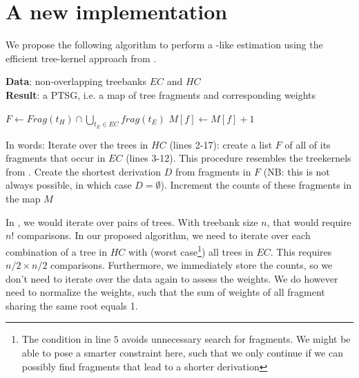 \section{A new implementation}


We propose the following algorithm to perform a \dops{}-like estimation using the efficient tree-kernel approach from \ddop{}.

\begin{algorithm}[H]
{\bf Data}: non-overlapping treebanks $EC$ and $HC$\\
{\bf Result}: a PTSG, i.e. a map of tree fragments and corresponding weights\\
\begin{algorithmic}[1]
	\State $F \gets Frag(t_H)\cap \bigcup\limits_{t_E\in EC} frag(t_E)$
		\State $M[f]\gets M[f]+1$
	\EndFor
\EndFor
{}
\EndFor	
\end{algorithmic}
\end{algorithm}

In words:
Iterate over the trees in $HC$ (lines 2-17): create a list $F$ of all of its fragments that occur in $EC$ (lines 3-12). This procedure resembles the treekernels from \ddop.
Create the shortest derivation $D$ from fragments in $F$ (NB: this is not always possible, in which case $D=\emptyset$). Increment the counts of these fragments in the map $M$

In \ddop, we would iterate over pairs of trees. With treebank size $n$, that would require $n!$ comparisons. In our proposed algorithm, we need to iterate over each combination of a tree in $HC$ with (worst case\footnote{The condition in line $5$ avoids unnecessary search for fragments. We might be able to pose a smarter constraint here, such that we only continue if we can possibly find fragments that lead to a shorter derivation}) all trees in $EC$. This requires $n/2 \times n/2$ comparisons. Furthermore, we immediately store the counts, so we don't need to iterate over the data again to assess the weights. We do however need to normalize the weights, such that the sum of weights of all fragment sharing the same root equals 1.